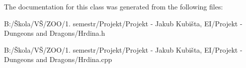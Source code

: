 The documentation for this class was generated from the following files\-:\begin{DoxyCompactItemize}
\item 
B\-:/Škola/\-VŠ/\-Z\-O\-O/1. semestr/\-Projekt/\-Projekt -\/ Jakub Kubišta, E\-I/\-Projekt -\/ Dungeons and Dragons/Hrdina.\-h\item 
B\-:/Škola/\-VŠ/\-Z\-O\-O/1. semestr/\-Projekt/\-Projekt -\/ Jakub Kubišta, E\-I/\-Projekt -\/ Dungeons and Dragons/Hrdina.\-cpp\end{DoxyCompactItemize}
